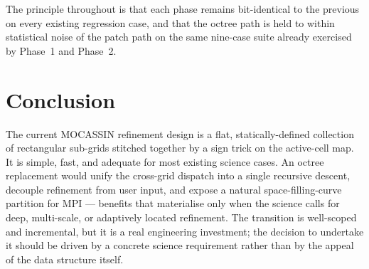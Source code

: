 \documentclass[11pt,a4paper]{my_memo}
\begin{document}
The principle throughout is that each phase remains bit-identical to the
previous on every existing regression case, and that the octree path is
held to within statistical noise of the patch path on the same nine-case
suite already exercised by Phase~1 and Phase~2.

\section{Conclusion}

The current MOCASSIN refinement design is a flat, statically-defined
collection of rectangular sub-grids stitched together by a sign trick on
the active-cell map.  It is simple, fast, and adequate for most existing
science cases.  An octree replacement would unify the cross-grid dispatch
into a single recursive descent, decouple refinement from user input, and
expose a natural space-filling-curve partition for MPI ---  benefits that
materialise only when the science calls for deep, multi-scale, or
adaptively located refinement.  The transition is well-scoped and
incremental, but it is a real engineering investment; the decision to
undertake it should be driven by a concrete science requirement rather than
by the appeal of the data structure itself.
\end{document}
